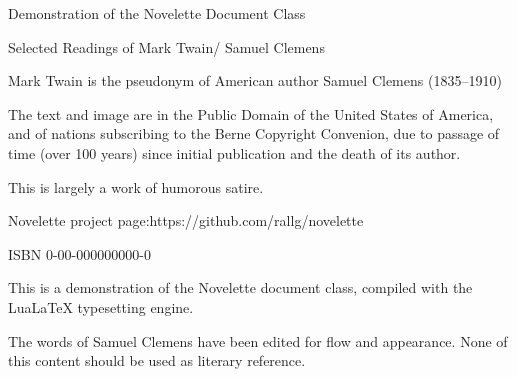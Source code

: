 \documentclass[../interior-demo.tex]{subfiles}
\begin{document}
\begin{displaypage} %
\null\null\null\null\null
{} %
\null\null\null
{}
\vfill %
{\centering Demonstration of the Novelette Document Class\par}
\end{displaypage}

\begin{copyrightpage}[center] %
\vfill %
Selected Readings of Mark Twain\br/ Samuel Clemens\par
Mark Twain is the pseudonym of American\br
author Samuel Clemens (1835--1910)\par
The text and image are in the Public Domain\br
of the United States of America, and of nations\br
subscribing to the Berne Copyright Convenion,\br
due to passage of time (over 100 years) since\br
initial publication and the death of its author.\par
This is largely a work of humorous satire.\par
Novelette project page:\br https://github.com/rallg/novelette\par
\centering ISBN 0-00-000000000-0\par
\end{copyrightpage}


\begin{displaypage} %
\vfil
{}
\null\null\null\null
\begin{blockindent}[2,2]
This is a demonstration of the Novelette document class, compiled
with the LuaLaTeX typesetting engine.\par
\null
The words of Samuel Clemens
have been edited for flow and appearance. None of this content
should be used as literary reference.\par
\end{blockindent}
\vfil
\end{displaypage}

\blankpage %
\end{document}
